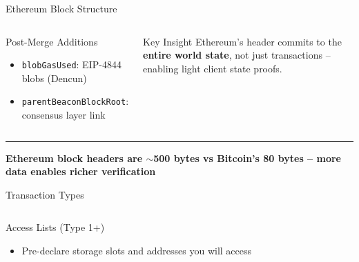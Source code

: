 \documentclass[8pt,aspectratio=169]{beamer}
\newcommand{\bottomnote}[1]{\vfill\vspace{-2mm}\textcolor{mllavender2}{\rule{\textwidth}{0.4pt}}\vspace{1mm}\footnotesize\textbf{#1}}
\begin{document}
\begin{frame}{Ethereum Block Structure}
\begin{columns}
\begin{block}{Post-Merge Additions}
\begin{itemize}
  \item \texttt{blobGasUsed}: EIP-4844 blobs (Dencun)
  \item \texttt{parentBeaconBlockRoot}: consensus layer link
\end{itemize}
\end{block}
\begin{alertblock}{Key Insight}
\small Ethereum's header commits to the \textbf{entire world state}, not just transactions -- enabling light client state proofs.
\end{alertblock}
\end{columns}
\bottomnote{Ethereum block headers are $\sim$500 bytes vs Bitcoin's 80 bytes -- more data enables richer verification}
\end{frame}

\begin{frame}{Transaction Types}
\begin{center}
\small
{}%
\end{center}
\vspace{2mm}
\begin{columns}
\begin{block}{Access Lists (Type 1+)}
\begin{itemize}\small
  \item Pre-declare storage slots and addresses you will access

\end{itemize}
\end{block}
\end{columns}
\end{frame}
\end{document}
